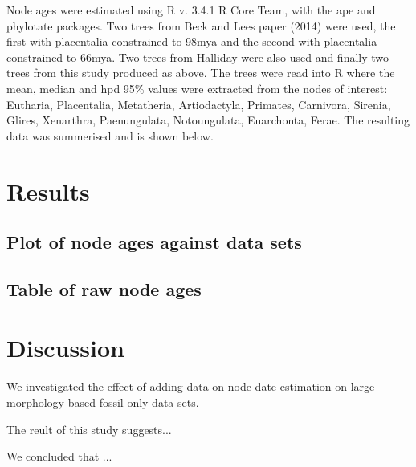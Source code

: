 \documentclass[11pt,letterpaper]{article}
\begin{document}
Node ages were estimated using R v. 3.4.1 R Core Team, with the ape and phylotate packages. Two trees from Beck and Lees paper (2014) were used, the first with placentalia constrained to 98mya and the second with placentalia constrained to 66mya. Two trees from Halliday were also used and finally two trees from this study produced as above. The trees were read into R where the mean, median and hpd 95\% values were extracted from the nodes of interest: Eutharia, Placentalia, Metatheria, Artiodactyla, Primates, Carnivora, Sirenia, Glires, Xenarthra, Paenungulata, Notoungulata, Euarchonta, Ferae. The resulting data was summerised and is shown below. 

\newpage

\section{Results} 

\subsection{Plot of node ages against data sets}


\subsection{Table of raw node ages}


\newpage

\section{Discussion}

We investigated the effect of adding data on node date estimation on large morphology-based fossil-only data sets.

The reult of this study suggests...

We concluded that ...
\end{document}
